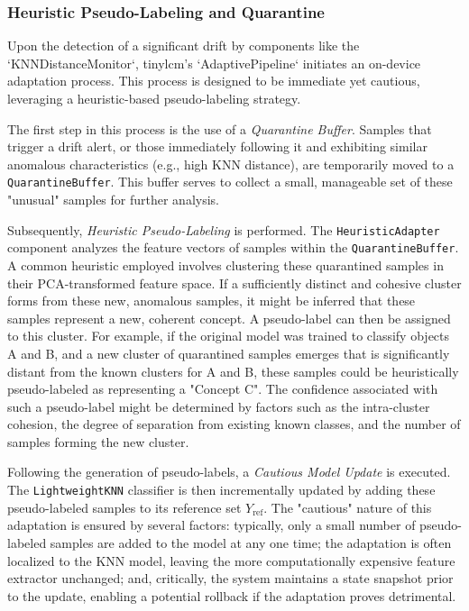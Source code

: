 \subsubsection{Heuristic Pseudo-Labeling and Quarantine}
\label{sssec:tinylcm_heuristic_adaptation}

Upon the detection of a significant drift by components like the `KNNDistanceMonitor`, \gls{tinylcm}'s `AdaptivePipeline` initiates an on-device adaptation process. This process is designed to be immediate yet cautious, leveraging a heuristic-based pseudo-labeling strategy.

The first step in this process is the use of a \textit{Quarantine Buffer}. Samples that trigger a drift alert, or those immediately following it and exhibiting similar anomalous characteristics (e.g., high KNN distance), are temporarily moved to a \texttt{QuarantineBuffer}. This buffer serves to collect a small, manageable set of these "unusual" samples for further analysis.

Subsequently, \textit{Heuristic Pseudo-Labeling} is performed. The \texttt{HeuristicAdapter} component analyzes the feature vectors of samples within the \texttt{QuarantineBuffer}. A common heuristic employed involves clustering these quarantined samples in their PCA-transformed feature space. If a sufficiently distinct and cohesive cluster forms from these new, anomalous samples, it might be inferred that these samples represent a new, coherent concept. A pseudo-label can then be assigned to this cluster. For example, if the original model was trained to classify objects A and B, and a new cluster of quarantined samples emerges that is significantly distant from the known clusters for A and B, these samples could be heuristically pseudo-labeled as representing a "Concept C". The confidence associated with such a pseudo-label might be determined by factors such as the intra-cluster cohesion, the degree of separation from existing known classes, and the number of samples forming the new cluster. %

Following the generation of pseudo-labels, a \textit{Cautious Model Update} is executed. The \texttt{LightweightKNN} classifier is then incrementally updated by adding these pseudo-labeled samples to its reference set $Y_{\mathrm{ref}}$. The "cautious" nature of this adaptation is ensured by several factors: typically, only a small number of pseudo-labeled samples are added to the model at any one time; the adaptation is often localized to the KNN model, leaving the more computationally expensive feature extractor unchanged; and, critically, the system maintains a state snapshot prior to the update, enabling a potential rollback if the adaptation proves detrimental.

